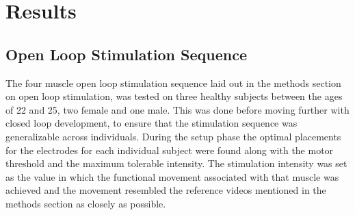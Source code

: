 




\section{Results}

\subsection{Open Loop Stimulation Sequence}
The four muscle open loop stimulation sequence laid out in the methods section on open loop stimulation, was tested on three healthy subjects between the ages of 22 and 25, two female and one male. This was done before moving further with closed loop development, to ensure that the stimulation sequence was generalizable across individuals. During the setup phase the optimal placements for the electrodes for each individual subject were found along with the motor threshold and the maximum tolerable intensity. The stimulation intensity was set as the value in which the functional movement associated with that muscle was achieved and the movement resembled the reference videos mentioned in the methods section as closely as possible.

